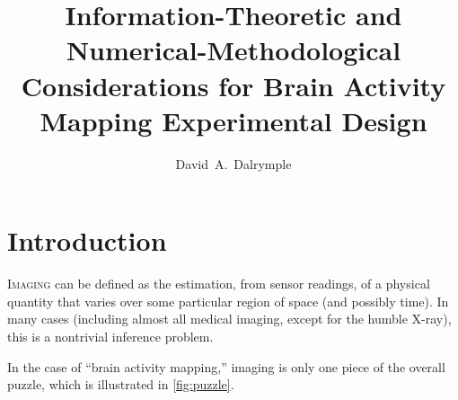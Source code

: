 
%

\title{Information-Theoretic and Numerical-Methodological Considerations for Brain Activity Mapping Experimental Design}

\author[1,2]{David~A.~Dalrymple}


\newcommand\et{{\em \&}}


\renewcommand{\maketitlehookc}{{\small\raggedright Correspondence to: \texttt{david\,\textnormal{(at)}\,\,dalrymple.co}}}


\maketitle
\pagestyle{plain}
\thispagestyle{empty}

\section{Introduction}

\textsc{Imaging} can be defined as the estimation, from sensor readings, of a physical quantity that varies over some particular region of space (and possibly time). In many cases (including almost all medical imaging, except for the humble X-ray), this is a nontrivial inference problem.

In the case of ``brain activity mapping,'' imaging is only one piece of the overall puzzle, which is illustrated in \autoref{fig:puzzle}.


